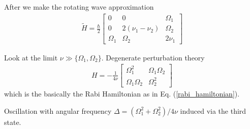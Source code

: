 After we make the rotating wave approximation
\begin{align}
  \tilde{H}=\frac{\hbar}{2}
  \begin{bmatrix}
    0 & 0 & \Omega_1 \\
    0 & 2(\nu_1 - \nu_2) & \Omega_2  \\
    \Omega_1 & \Omega_2  & 2\nu_1
  \end{bmatrix}
\end{align}

Look at the limit $\nu \gg \{\Omega_1, \Omega_2\}$.  Degenerate perturbation theory
\begin{align}
  H = -\frac{1}{4\nu}
  \begin{bmatrix}
    \Omega_1^2 & \Omega_1 \Omega_2 \\
    \Omega_1\Omega_2 & \Omega_2^2
  \end{bmatrix}
\end{align}
which is the basically the Rabi Hamiltonian as in Eq. (\ref{rabi_hamiltonian}).

Oscillation with angular frequency $\Delta = (\Omega_1^2 + \Omega_2^2)/4\nu$ induced via the third state.



